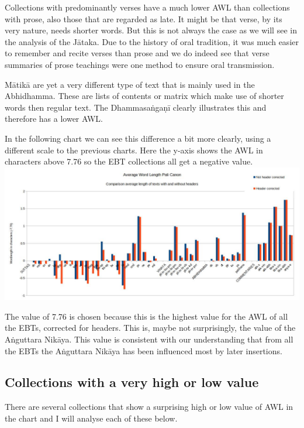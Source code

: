 Collections with predominantly verses have a much lower AWL than collections with prose, also those that are regarded as late. It might be that verse, by its very nature, needs shorter words. But this is not always the case as we will see in the analysis of the Jātaka. Due to the history of oral tradition, it was much easier to remember and recite verses than prose and we do indeed see that verse summaries of prose teachings were one method to ensure oral transmission.

Mātikā are yet a very different type of text that is mainly used in the Abhidhamma. These are lists of contents or matrix which make use of shorter words then regular text. The Dhammasaṅgaṇī clearly illustrates this and therefore has a lower AWL.

In the following chart we can see this difference a bit more clearly, using a different scale to the previous charts. Here the y-axis shows the AWL in characters above 7.76 so the EBT collections all get a negative value.\\

\includegraphics[width=\linewidth]{chart3.jpg}
\label{chart3}

\medskip
The value of 7.76 is chosen because this is the highest value for the AWL of all the EBTs, corrected for headers. This is, maybe not surprisingly, the value of the Aṅguttara Nikāya. This value is consistent with our understanding that from all the EBTs the Aṅguttara Nikāya has been influenced most by later insertions.

\subsection{Collections with a very high or low value}
There are several collections that show a surprising high or low value of AWL in the chart and I will analyse each of these below.

